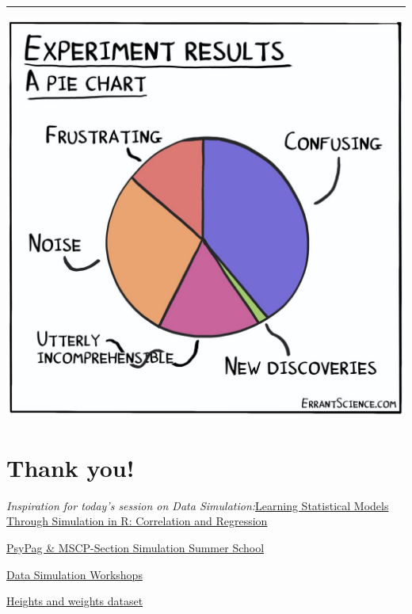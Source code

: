 \documentclass[
]{article}
\begin{document}
\begin{center}\rule{0.5\linewidth}{0.5pt}\end{center}

\includegraphics{images/experiment-results.jpg}

\hypertarget{thank-you}{%
\section{Thank you!}\label{thank-you}}

\emph{Inspiration for today's session on Data
Simulation:}\href{https://psyteachr.github.io/stat-models-v1/correlation-and-regression.html}{Learning
Statistical Models Through Simulation in R: Correlation and Regression}

\href{https://simsummerschool.github.io/}{PsyPag \& MSCP-Section
Simulation Summer School}

\href{https://debruine.github.io/data-sim-workshops/}{Data Simulation
Workshops}

\href{https://www.geogebra.org/m/RRprACv4}{Heights and weights dataset}
\end{document}
